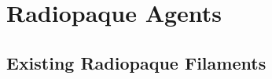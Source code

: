 \section{Radiopaque Agents\label{sec:literatureReview:radiopaque}}

\subsection{Existing Radiopaque Filaments\label{sec:literatureReview:radiopaque:filaments}}
